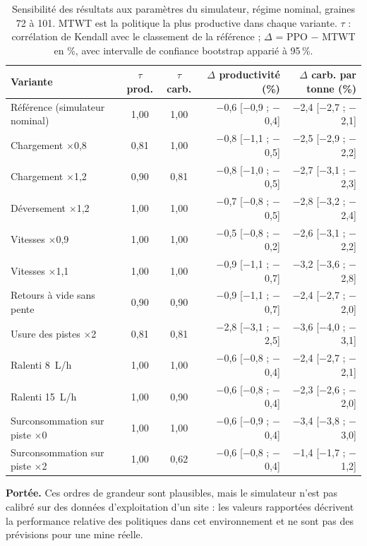 \documentclass[11pt,a4paper]{article}
\newif\ifcorrmarks
\newenvironment{corrbloc}{\par\ifcorrmarks\color{corrcolor}\fi}{\par}
\begin{document}
\begin{corrbloc}
\begin{table}[H]
\centering
\caption{Sensibilité des résultats aux paramètres du simulateur, régime nominal, graines 72 à 101. MTWT est la politique la plus productive dans chaque variante. $\tau$ : corrélation de Kendall avec le classement de la référence ; $\Delta$ = PPO $-$ MTWT en \%, avec intervalle de confiance bootstrap apparié à 95\,\%.}
\label{tab:sensitivity}
\small
\setlength{\tabcolsep}{5pt}
\begin{tabular}{@{}lccrr@{}}
\toprule
\textbf{Variante} & \textbf{$\tau$ prod.} & \textbf{$\tau$ carb.} & \textbf{$\Delta$ productivité (\%)} & \textbf{$\Delta$ carb. par tonne (\%)} \\
\midrule
Référence (simulateur nominal) & 1{,}00 & 1{,}00 & $-$0{,}6 [$-$0{,}9 ; $-$0{,}4] & $-$2{,}4 [$-$2{,}7 ; $-$2{,}1] \\
\midrule
Chargement $\times$0,8 & 0{,}81 & 1{,}00 & $-$0{,}8 [$-$1{,}1 ; $-$0{,}5] & $-$2{,}5 [$-$2{,}9 ; $-$2{,}2] \\
Chargement $\times$1,2 & 0{,}90 & 0{,}81 & $-$0{,}8 [$-$1{,}0 ; $-$0{,}5] & $-$2{,}7 [$-$3{,}1 ; $-$2{,}3] \\
Déversement $\times$1,2 & 1{,}00 & 1{,}00 & $-$0{,}7 [$-$0{,}8 ; $-$0{,}5] & $-$2{,}8 [$-$3{,}2 ; $-$2{,}4] \\
Vitesses $\times$0,9 & 1{,}00 & 1{,}00 & $-$0{,}5 [$-$0{,}8 ; $-$0{,}2] & $-$2{,}6 [$-$3{,}1 ; $-$2{,}2] \\
Vitesses $\times$1,1 & 1{,}00 & 1{,}00 & $-$0{,}9 [$-$1{,}1 ; $-$0{,}7] & $-$3{,}2 [$-$3{,}6 ; $-$2{,}8] \\
Retours à vide sans pente & 0{,}90 & 0{,}90 & $-$0{,}9 [$-$1{,}1 ; $-$0{,}7] & $-$2{,}4 [$-$2{,}7 ; $-$2{,}0] \\
Usure des pistes $\times$2 & 0{,}81 & 0{,}81 & $-$2{,}8 [$-$3{,}1 ; $-$2{,}5] & $-$3{,}6 [$-$4{,}0 ; $-$3{,}1] \\
Ralenti 8~L/h & 1{,}00 & 1{,}00 & $-$0{,}6 [$-$0{,}8 ; $-$0{,}4] & $-$2{,}4 [$-$2{,}7 ; $-$2{,}1] \\
Ralenti 15~L/h & 1{,}00 & 0{,}90 & $-$0{,}6 [$-$0{,}8 ; $-$0{,}4] & $-$2{,}3 [$-$2{,}6 ; $-$2{,}0] \\
Surconsommation sur piste $\times$0 & 1{,}00 & 1{,}00 & $-$0{,}6 [$-$0{,}9 ; $-$0{,}4] & $-$3{,}4 [$-$3{,}8 ; $-$3{,}0] \\
Surconsommation sur piste $\times$2 & 1{,}00 & 0{,}62 & $-$0{,}6 [$-$0{,}8 ; $-$0{,}4] & $-$1{,}4 [$-$1{,}7 ; $-$1{,}2] \\
\bottomrule
\end{tabular}
\end{table}

\textbf{Portée.} Ces ordres de grandeur sont plausibles, mais le simulateur n'est pas calibré sur des données d'exploitation d'un site : les valeurs rapportées décrivent la performance relative des politiques dans cet environnement et ne sont pas des prévisions pour une mine réelle.
\end{corrbloc}
\end{document}
